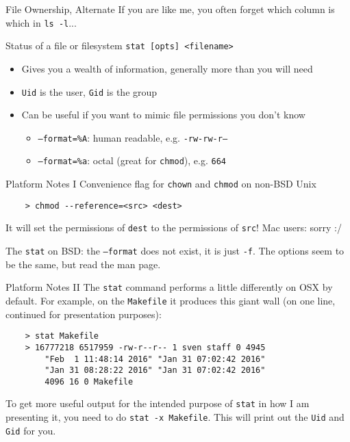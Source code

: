 \documentclass[11pt]{beamer}
\newcommand{\colbf}[1]{\textcolor{mLightBrown!77!black}{#1}}%
\def\wl{\par \vspace{\baselineskip}}                        %
\begin{document}
\begin{frame}[fragile]{File Ownership, Alternate}
  If you are like me, you often forget which column is which in \texttt{ls -l}...\wl

  \begin{block}{\colbf{Stat}us of a file or filesystem}
    \texttt{stat [opts] <filename>}
    \begin{itemize}
      \item Gives you a wealth of information, generally more than you will need
      \item \texttt{Uid} is the user, \texttt{Gid} is the group
      \item Can be useful if you want to mimic file permissions you don't know
      \begin{itemize}
        \item \texttt{--format=\%A}: human readable, e.g. \texttt{-rw-rw-r--}
        \item \texttt{--format=\%a}: octal (great for \texttt{chmod}), e.g. \texttt{664}
      \end{itemize}
    \end{itemize}
  \end{block}
\end{frame}

\begin{frame}[fragile]{Platform Notes I}
  Convenience flag for \texttt{chown} and \texttt{chmod} on non-BSD Unix

  \begin{verbatim}
    > chmod --reference=<src> <dest>
  \end{verbatim}

  It will set the permissions of \texttt{dest} to the permissions of \texttt{src}!
  Mac users: sorry :/

  The \texttt{stat} on BSD: the \texttt{--format} does not exist, it is just \texttt{-f}.  The options seem
  to be the same, but read the man page.
\end{frame}

\begin{frame}[fragile]{Platform Notes II}
  The \texttt{stat} command performs a little differently on OSX by default.  For example, on the \texttt{Makefile}
  it produces this giant wall (on one line, continued for presentation purposes):

  \begin{verbatim}
    > stat Makefile
    > 16777218 6517959 -rw-r--r-- 1 sven staff 0 4945
        "Feb  1 11:48:14 2016" "Jan 31 07:02:42 2016"
        "Jan 31 08:28:22 2016" "Jan 31 07:02:42 2016"
        4096 16 0 Makefile
  \end{verbatim}

  To get more useful output for the intended purpose of \texttt{stat} in how I am presenting it, you need to do
  \texttt{stat -x Makefile}.  This will print out the \texttt{Uid} and \texttt{Gid} for you.
\end{frame}
\end{document}
